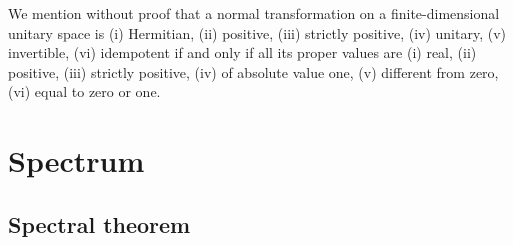 We mention without proof that
a normal transformation on a finite-dimensional unitary space is
(i) Hermitian,
(ii) positive,
(iii) strictly positive,
(iv) unitary,
(v) invertible,
(vi) idempotent
if and only if all its proper values are
(i) real,
(ii) positive,
(iii) strictly positive,
(iv) of absolute value one,
(v) different from zero,
(vi) equal to zero or one.

\section{Spectrum}

\subsection{Spectral theorem}
\label{2012-m-ch-Spectraltheorem}

